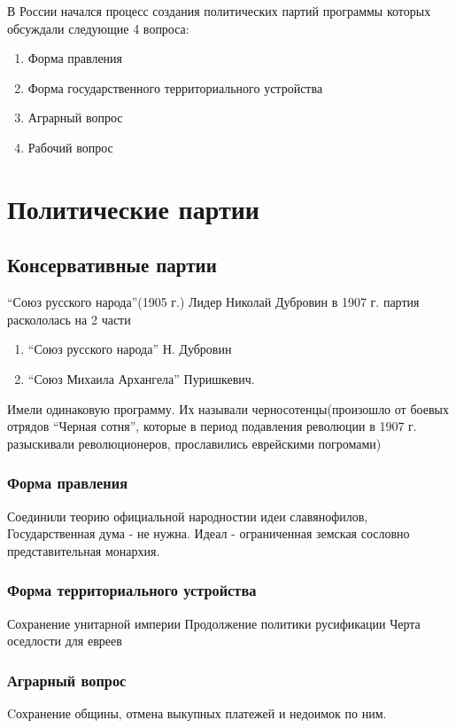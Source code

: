 \documentclass[a4paper]{article}
\begin{document}
В России начался процесс создания политических партий программы которых обсуждали следующие 4 вопроса:

\begin{enumerate}
    \item Форма правления
    \item Форма государственного территориального устройства
    \item Аграрный вопрос
    \item Рабочий вопрос
\end{enumerate}

\section{Политические партии}

\subsection{Консервативные партии}
``Союз русского народа''(1905 г.) Лидер Николай Дубровин в 1907 г. партия раскололась на 2 части
\begin{enumerate}
    \item  ``Союз русского народа'' Н. Дубровин
    \item ``Союз Михаила Архангела'' Пуришкевич.
\end{enumerate}

Имели одинаковую программу. Их называли черносотенцы(произошло от боевых отрядов ``Черная сотня'', которые в период подавления революции в 1907 г. разыскивали революционеров, прославились еврейскими погромами)

\subsubsection{Форма правления}
Соединили теорию официальной народностии идеи славянофилов,
Государственная дума - не нужна.
Идеал - ограниченная земская сословно представительная монархия.
\subsubsection{Форма территориального устройства}
Сохранение унитарной империи
Продолжение политики русификации
Черта оседлости для евреев
\subsubsection{Аграрный вопрос}
Cохранение общины, отмена выкупных платежей и недоимок по ним.
\end{document}
